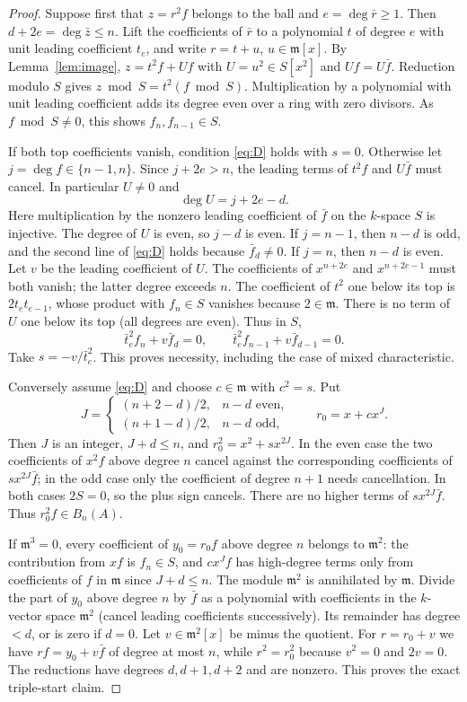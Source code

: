 \documentclass[11pt]{article}
\theoremstyle{remark}\newtheorem{remark}[theorem]{Remark}
\newcommand{\m}{\mathfrak m}
\begin{document}
\begin{proof}
Suppose first that $z=r^2f$ belongs to the ball and $e=\deg\bar r\ge1$. Then $d+2e=\deg\bar z\le n$. Lift the coefficients of $\bar r$ to a polynomial $t$ of degree $e$ with unit leading coefficient $t_e$, and write $r=t+u$, $u\in\m[x]$. By Lemma~\ref{lem:image}, $z=t^2f+Uf$ with $U=u^2\in S[x^2]$ and $Uf=U\bar f$. Reduction modulo $S$ gives $z\bmod S=t^2(f\bmod S)$. Multiplication by a polynomial with unit leading coefficient adds its degree even over a ring with zero divisors. As $f\bmod S\ne0$, this shows $f_n,f_{n-1}\in S$.

If both top coefficients vanish, condition \eqref{eq:D} holds with $s=0$. Otherwise let $j=\deg f\in\{n-1,n\}$. Since $j+2e>n$, the leading terms of $t^2f$ and $U\bar f$ must cancel. In particular $U\ne0$ and
\[
 \deg U=j+2e-d.
\]
Here multiplication by the nonzero leading coefficient of $\bar f$ on the $k$-space $S$ is injective. The degree of $U$ is even, so $j-d$ is even. If $j=n-1$, then $n-d$ is odd, and the second line of \eqref{eq:D} holds because $\bar f_d\ne0$. If $j=n$, then $n-d$ is even. Let $v$ be the leading coefficient of $U$. The coefficients of $x^{n+2e}$ and $x^{n+2e-1}$ must both vanish; the latter degree exceeds $n$. The coefficient of $t^2$ one below its top is $2t_et_{e-1}$, whose product with $f_n\in S$ vanishes because $2\in\m$. There is no term of $U$ one below its top (all degrees are even). Thus in $S$,
\[
 \bar t_e^2 f_n+v\bar f_d=0,\qquad
 \bar t_e^2 f_{n-1}+v\bar f_{d-1}=0.
\]
Take $s=-v/\bar t_e^2$. This proves necessity, including the case of mixed characteristic.

Conversely assume \eqref{eq:D} and choose $c\in\m$ with $c^2=s$. Put
\[
 J=\begin{cases}(n+2-d)/2,&n-d\text{ even},\\
 (n+1-d)/2,&n-d\text{ odd},\end{cases}\qquad r_0=x+cx^J.
\]
Then $J$ is an integer, $J+d\le n$, and $r_0^2=x^2+sx^{2J}$. In the even case the two coefficients of $x^2f$ above degree $n$ cancel against the corresponding coefficients of $sx^{2J}\bar f$; in the odd case only the coefficient of degree $n+1$ needs cancellation. In both cases $2S=0$, so the plus sign cancels. There are no higher terms of $sx^{2J}\bar f$. Thus $r_0^2 f\in B_n(A)$.

If $\m^3=0$, every coefficient of $y_0=r_0f$ above degree $n$ belongs to $\m^2$: the contribution from $xf$ is $f_n\in S$, and $cx^J f$ has high-degree terms only from coefficients of $f$ in $\m$ since $J+d\le n$. The module $\m^2$ is annihilated by $\m$. Divide the part of $y_0$ above degree $n$ by $\bar f$ as a polynomial with coefficients in the $k$-vector space $\m^2$ (cancel leading coefficients successively). Its remainder has degree $<d$, or is zero if $d=0$. Let $v\in\m^2[x]$ be minus the quotient. For $r=r_0+v$ we have $rf=y_0+v\bar f$ of degree at most $n$, while $r^2=r_0^2$ because $v^2=0$ and $2v=0$. The reductions have degrees $d,d+1,d+2$ and are nonzero. This proves the exact triple-start claim.


\end{proof}
\end{document}
